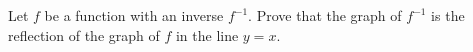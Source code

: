 Let $f$ be a function with an inverse $f^{-1}$. Prove that the graph of $f^{-1}$ is the reflection of the graph of $f$ in the line $y=x$.
